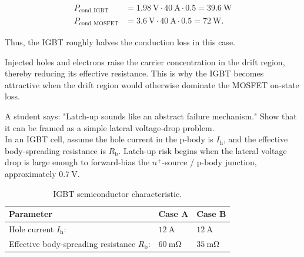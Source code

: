 
\begin{solutionblock}
    \begin{align}
        P_\mathrm{cond,IGBT} &= \SI{1.98}{\volt} \cdot \SI{40}{\ampere} \cdot 0.5 = \SI{39.6}{\watt} \\
        P_\mathrm{cond,MOSFET} &= \SI{3.6}{\volt} \cdot \SI{40}{\ampere} \cdot 0.5 = \SI{72}{\watt}.
    \end{align}

    Thus, the IGBT roughly halves the conduction loss in this case.
\end{solutionblock}


\begin{solutionblock}
    Injected holes and electrons raise the carrier concentration in the drift region, thereby reducing its effective resistance.
    This is why the IGBT becomes attractive when the drift region would otherwise dominate the MOSFET on-state loss.
\end{solutionblock}




A student says: "Latch-up sounds like an abstract failure mechanism."
Show that it can be framed as a simple lateral voltage-drop problem.\\

In an IGBT cell, assume the hole current in the p-body is $I_\mathrm{h}$, and the effective body-spreading resistance is $R_\mathrm{b}$.
Latch-up risk begins when the lateral voltage drop is large enough to forward-bias the $n^+$-source / p-body junction, approximately $\SI{0.7}{\volt}$.

\begin{table}[ht]
    \centering
    \begin{tabular}{lll}
        \toprule
        Parameter  & \textbf{Case A} & \textbf{Case B} \\
        \midrule
        Hole current $I_\mathrm{h}$: & $\SI{12}{\ampere}$ & $\SI{12}{\ampere}$  \\
        Effective body-spreading resistance $R_\mathrm{b}$: & $\SI{60}{\milli\ohm}$ & $\SI{35}{\milli\ohm}$ \\
        \bottomrule
    \end{tabular}
    \caption{IGBT semiconductor characteristic.}
    \label{table:igbt_task2_device}
\end{table}

